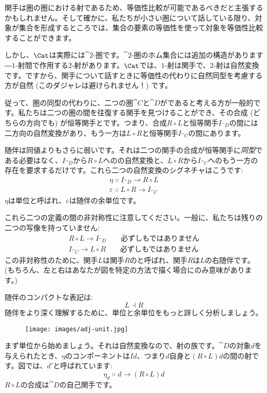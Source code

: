関手は圏の圏における射であるため、等価性比較が可能であるべきだと主張するかもしれません。そして確かに、私たちが小さい圏について話している限り、対象が集合を形成するところでは、集合の要素の等価性を使って対象を等価性比較することができます。

しかし、$\Cat$は実際には$\cat{2}$-圏です。$\cat{2}$-圏のホム集合には追加の構造があります―$1$-射間で作用する$2$-射があります。$\Cat$では、$1$-射は関手で、$2$-射は自然変換です。ですから、関手について話すときに等価性の代わりに自然同型を考慮する方が自然 (このダジャレは避けられません！) です。

従って、圏の同型の代わりに、二つの圏$\cat{C}$と$\cat{D}$がであると考える方が一般的です。私たちは二つの圏の間を往復する関手を見つけることができ、その合成 (どちらの方向でも) が恒等関手とです。つまり、合成$R \circ L$と恒等関手$I_{\cat{D}}$の間には二方向の自然変換があり、もう一方は$L \circ R$と恒等関手$I_{\cat{C}}$の間にあります。

随伴は同値よりもさらに弱いです。それは二つの関手の合成が恒等関手に\emph{同型}である必要はなく、$I_{\cat{D}}$から$R \circ L$へのの自然変換と、$L \circ R$から$I_{\cat{C}}$へのもう一方の存在を要求するだけです。これら二つの自然変換のシグネチャはこうです: 
\begin{gather*}
  \eta \Colon I_{\cat{D}} \to R \circ L \\
  \varepsilon \Colon L \circ R \to I_{\cat{C}}
\end{gather*}
$\eta$は単位と呼ばれ、$\varepsilon$は随伴の余単位です。

これら二つの定義の間の非対称性に注意してください。一般に、私たちは残りの二つの写像を持っていません: 
\begin{gather*}
  R \circ L \to I_{\cat{D}} \quad\quad\text{必ずしもではありません} \\
  I_{\cat{C}} \to L \circ R \quad\quad\text{必ずしもではありません}
\end{gather*}
この非対称性のために、関手$L$は関手$R$のと呼ばれ、関手$R$は$L$の右随伴です。(もちろん、左と右はあなたが図を特定の方法で描く場合にのみ意味があります。) 

随伴のコンパクトな表記は: 
\[L \dashv R\]
随伴をより深く理解するために、単位と余単位をもっと詳しく分析しましょう。

\begin{figure}[H]
  \centering
  \texttt{[image: images/adj-unit.jpg]}
\end{figure}

\noindent
まず単位から始めましょう。それは自然変換なので、射の族です。$\cat{D}$の対象$d$を与えられたとき、$\eta$のコンポーネントは$I d$、つまり$d$自身と$(R \circ L) d$の間の射です。図では、$d'$と呼ばれています: 
\[\eta_d \Colon d \to (R \circ L) d\]
$R \circ L$の合成は$\cat{D}$の自己関手です。

